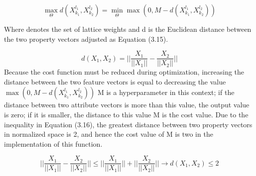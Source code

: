 \documentclass[journal]{IEEEtran}
\begin{document}
\begin{equation}\label{eq:pid1obj}
	\max_{\Theta} {d( X_{k_1}^{l_1},X_{k_2}^{l_2} )} = \min_{\Theta}{\max(0,M-d( X_{k_1}^{l_1},X_{k_2}^{l_2} ))}
\end{equation}

Where  denotes the set of lattice weights and d is the Euclidean distance between the two property vectors adjusted as Equation (3.15).

  \begin{equation}\label{eq:dfunc}
	d(X_1,X_2) = ||\frac{X_1}{||X_1||}-\frac{X_2}{||X_2||}||
\end{equation}
Because the cost function must be reduced during optimization, increasing the distance between the two feature vectors is equal to decreasing the value
$\max(0,M-d( X_{k_1}^{l_1},X_{k_2}^{l_2} ))$ M is a hyperparameter in this context; if the distance between two attribute vectors is more than this value, the output value is zero; if it is smaller, the distance to this value M is the cost value.
Due to the inequality in Equation (3.16), the greatest distance between two property vectors in normalized space is 2, and hence the cost value of M is two in the implementation of this function.

  \begin{equation}\label{eq:ne}
	||\frac{X_1}{||X_1||}-\frac{X_2}{||X_2||}|| \le ||\frac{X_1}{||X_1||}||+||\frac{X_2}{||X_2||}||   \to d(X_1,X_2) \le 2
\end{equation}
\end{document}

